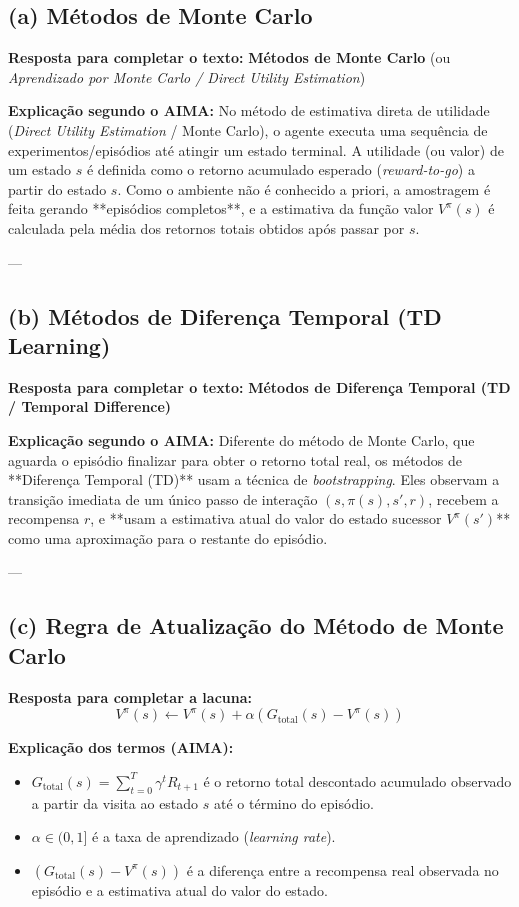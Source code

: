 \documentclass[a4paper,12pt]{article}
\begin{document}
\subsection*{(a) Métodos de Monte Carlo}
\textbf{Resposta para completar o texto:} \textbf{Métodos de Monte Carlo} (ou \textit{Aprendizado por Monte Carlo / Direct Utility Estimation})

\textbf{Explicação segundo o AIMA:}
No método de estimativa direta de utilidade (\textit{Direct Utility Estimation} / Monte Carlo), o agente executa uma sequência de experimentos/episódios até atingir um estado terminal. A utilidade (ou valor) de um estado $s$ é definida como o retorno acumulado esperado (\textit{reward-to-go}) a partir do estado $s$. Como o ambiente não é conhecido a priori, a amostragem é feita gerando **episódios completos**, e a estimativa da função valor $V^\pi(s)$ é calculada pela média dos retornos totais obtidos após passar por $s$.

---

\subsection*{(b) Métodos de Diferença Temporal (TD Learning)}
\textbf{Resposta para completar o texto:} \textbf{Métodos de Diferença Temporal (TD / Temporal Difference)}

\textbf{Explicação segundo o AIMA:}
Diferente do método de Monte Carlo, que aguarda o episódio finalizar para obter o retorno total real, os métodos de **Diferença Temporal (TD)** usam a técnica de \textit{bootstrapping}. Eles observam a transição imediata de um único passo de interação $(s, \pi(s), s', r)$, recebem a recompensa $r$, e **usam a estimativa atual do valor do estado sucessor $V^\pi(s')$** como uma aproximação para o restante do episódio.

---

\subsection*{(c) Regra de Atualização do Método de Monte Carlo}
\textbf{Resposta para completar a lacuna:}
\begin{equation}
	V^\pi(s) \leftarrow V^\pi(s) + \alpha \left( G_{\text{total}}(s) - V^\pi(s) \right)
\end{equation}

\textbf{Explicação dos termos (AIMA):}
\begin{itemize}
	\item $G_{\text{total}}(s) = \sum_{t=0}^{T} \gamma^t R_{t+1}$ é o retorno total descontado acumulado observado a partir da visita ao estado $s$ até o término do episódio.
	\item $\alpha \in (0, 1]$ é a taxa de aprendizado (\textit{learning rate}).
	\item $\left( G_{\text{total}}(s) - V^\pi(s) \right)$ é a diferença entre a recompensa real observada no episódio e a estimativa atual do valor do estado.
\end{itemize}
\end{document}
